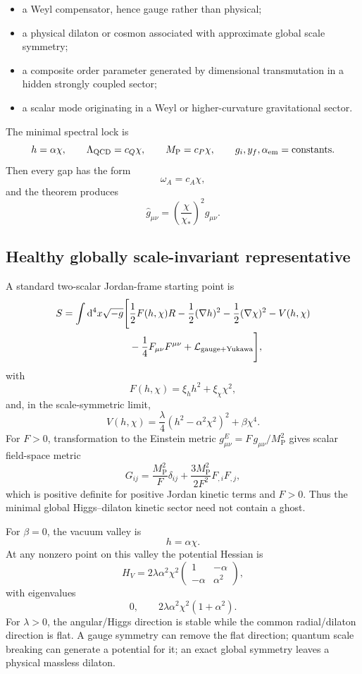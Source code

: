 \documentclass[11pt,a4paper]{article}
\newcommand{\dd}{\mathrm{d}}
\newcommand{\Lag}{\mathcal{L}}
\newcommand{\MP}{M_{\mathrm P}}
\begin{document}
\begin{itemize}
  \item a Weyl compensator, hence gauge rather than physical;
  \item a physical dilaton or cosmon associated with approximate global scale symmetry;
  \item a composite order parameter generated by dimensional transmutation in a hidden strongly coupled sector;
  \item a scalar mode originating in a Weyl or higher-curvature gravitational sector.
\end{itemize}

The minimal spectral lock is
\[
 h=\alpha\chi,
 \qquad
 \Lambda_{\rm QCD}=c_Q\chi,
 \qquad
 \MP=c_P\chi,
 \qquad
 g_i,y_f,\alpha_{\rm em}=\text{constants}.
\]
Then every gap has the form
\[
 \omega_A=c_A\chi,
\]
and the theorem produces
\[
 \widehat g_{\mu\nu}=\left(\frac{\chi}{\chi_*}\right)^2g_{\mu\nu}.
\]

\subsection{Healthy globally scale-invariant representative}

A standard two-scalar Jordan-frame starting point is
\[
\begin{aligned}
S=\int\dd^4x\sqrt{-g}\Bigg[&
\frac12F(h,\chi)R
-\frac12(\nabla h)^2
-\frac12(\nabla\chi)^2
-V(h,\chi)\\
&-\frac14F_{\mu\nu}F^{\mu\nu}
+\Lag_{\rm gauge+Yukawa}
\Bigg],
\end{aligned}
\]
with
\[
 F(h,\chi)=\xi_hh^2+\xi_\chi\chi^2,
\]
and, in the scale-symmetric limit,
\[
 V(h,\chi)=\frac{\lambda}{4}(h^2-\alpha^2\chi^2)^2+\beta\chi^4.
\]
For $F>0$, transformation to the Einstein metric $g^E_{\mu\nu}=F\,g_{\mu\nu}/\MP^2$ gives scalar field-space metric
\[
 G_{ij}=\frac{\MP^2}{F}\delta_{ij}
 +\frac{3\MP^2}{2F^2}F_{,i}F_{,j},
\]
which is positive definite for positive Jordan kinetic terms and $F>0$. Thus the minimal global Higgs--dilaton kinetic sector need not contain a ghost.

For $\beta=0$, the vacuum valley is
\[
 h=\alpha\chi.
\]
At any nonzero point on this valley the potential Hessian is
\[
 H_V=2\lambda\alpha^2\chi^2
 \begin{pmatrix}
 1&-\alpha\\
 -\alpha&\alpha^2
 \end{pmatrix},
\]
with eigenvalues
\[
 0,
 \qquad
 2\lambda\alpha^2\chi^2(1+\alpha^2).
\]
For $\lambda>0$, the angular/Higgs direction is stable while the common radial/dilaton direction is flat. A gauge symmetry can remove the flat direction; quantum scale breaking can generate a potential for it; an exact global symmetry leaves a physical massless dilaton.
\end{document}
